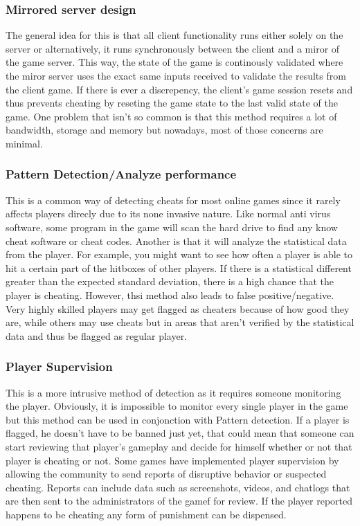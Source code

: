 \documentclass[sigconf]{acmart}
\begin{document}
\subsubsection{Mirrored server design}
The general idea for this is that all client functionality runs either solely on the server
or alternatively, it runs synchronously between the client and a miror of the game server. This way,
the state of the game is continously validated where the miror server uses the exact same inputs received
to validate the results from the client game. If there is ever a discrepency, the client's game session resets 
and thus prevents cheating by reseting the game state to the last valid state of the game. One problem that isn't so
common is that this method requires a lot of bandwidth, storage and memory but nowadays, most of those concerns are minimal.

\subsubsection{Pattern Detection/Analyze performance}
This is a common way of detecting cheats for most online games since it rarely affects players direcly due to its 
none invasive nature. Like normal anti virus software, some program in the game
will scan the hard drive to find any know cheat software or cheat codes. Another is that it will analyze the statistical
data from the player. For example, you might want to see how often a player is able to hit a certain part of the hitboxes
of other players. If there is a statistical different greater than the expected standard deviation, there is a high chance
that the player is cheating. However, thsi method also leads to false positive/negative. Very highly skilled players may
get flagged as cheaters because of how good they are, while others may use cheats but in areas that aren't verified by the
statistical data and thus be flagged as regular player.

\subsubsection{Player Supervision}
This is a more intrusive method of detection as it requires someone monitoring the player. Obviously, it is impossible
to monitor every single player in the game but this method can be used in conjonction with Pattern detection. If a player
is flagged, he doesn't have to be banned just yet, that could mean that someone can start reviewing that player's 
gameplay and decide for himself whether or not that player is cheating or not. Some games have implemented player 
supervision by allowing the community to send reports of disruptive behavior or suspected cheating. 
Reports can include data such as screenshots, videos, and chatlogs that are then sent to the administrators of the gamef
for review. If the player reported happens to be cheating any form of punishment can be dispensed.
\end{document}
